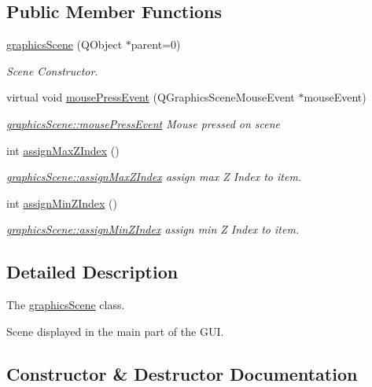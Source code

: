 \subsection*{Public Member Functions}
\begin{DoxyCompactItemize}
\item 
\mbox{\hyperlink{classgraphics_scene_a630f565d827637e6f46f5ae2e786cd06}{graphics\+Scene}} (Q\+Object $\ast$parent=0)
\begin{DoxyCompactList}\small\item\em Scene Constructor. \end{DoxyCompactList}\item 
virtual void \mbox{\hyperlink{classgraphics_scene_a45ca641319ec6accb1574f52539e7517}{mouse\+Press\+Event}} (Q\+Graphics\+Scene\+Mouse\+Event $\ast$mouse\+Event)
\begin{DoxyCompactList}\small\item\em \mbox{\hyperlink{classgraphics_scene_a45ca641319ec6accb1574f52539e7517}{graphics\+Scene\+::mouse\+Press\+Event}} Mouse pressed on scene \end{DoxyCompactList}\item 
int \mbox{\hyperlink{classgraphics_scene_a91aee253bbbf22a698685ad509945960}{assign\+Max\+Z\+Index}} ()
\begin{DoxyCompactList}\small\item\em \mbox{\hyperlink{classgraphics_scene_a91aee253bbbf22a698685ad509945960}{graphics\+Scene\+::assign\+Max\+Z\+Index}} assign max Z Index to item. \end{DoxyCompactList}\item 
int \mbox{\hyperlink{classgraphics_scene_aeb9feecebc1be01a976b14d6b20382d6}{assign\+Min\+Z\+Index}} ()
\begin{DoxyCompactList}\small\item\em \mbox{\hyperlink{classgraphics_scene_aeb9feecebc1be01a976b14d6b20382d6}{graphics\+Scene\+::assign\+Min\+Z\+Index}} assign min Z Index to item. \end{DoxyCompactList}\end{DoxyCompactItemize}


\subsection{Detailed Description}
The \mbox{\hyperlink{classgraphics_scene}{graphics\+Scene}} class. 

Scene displayed in the main part of the G\+UI. 

\subsection{Constructor \& Destructor Documentation}
\mbox{\label{classgraphics_scene_a630f565d827637e6f46f5ae2e786cd06}} 

